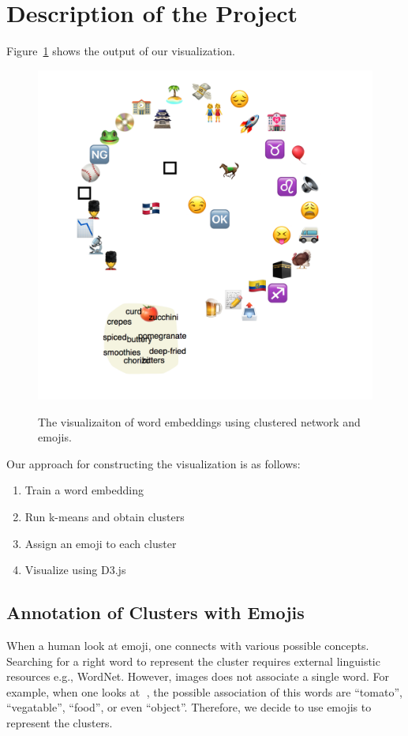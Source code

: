 \section{Description of the Project}
Figure~\ref{fig:cluster_network} shows the output of our visualization. 

\begin{figure}[htb]
 \centering
     {\includegraphics[width=0.68\linewidth]{figures/clustered_network.png}}
    \vspace{-1ex}
     \caption{The visualizaiton of word embeddings using clustered network and emojis.}
\label{fig:cluster_network}
\end{figure}


Our approach for constructing the visualization is as follows:
\begin{enumerate}
 \item Train a word embedding
 \item Run k-means and obtain clusters
 \item Assign an emoji to each cluster
 \item Visualize using D3.js
\end{enumerate}

\subsection{Annotation of Clusters with Emojis}
When a human look at emoji, one connects with various possible concepts. 
Searching for a right word to represent the cluster requires external linguistic resources e.g., WordNet. 
However, images does not associate a single word. 
For example, when one looks at 🍅, the possible association of this words are ``tomato'', ``vegatable'', ``food'', or even ``object''. 
Therefore, we decide to use emojis to represent the clusters. 


